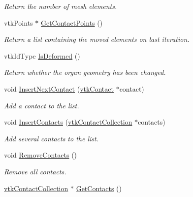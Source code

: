\begin{DoxyCompactItemize}
\begin{DoxyCompactList}\small\item\em Return the number of mesh elements. \item\end{DoxyCompactList}\item 
\hypertarget{classvtkOrgan_a4a34329d800d6b9f95c8b2dbcaddd520}{
vtkPoints $\ast$ \hyperlink{classvtkOrgan_a4a34329d800d6b9f95c8b2dbcaddd520}{GetContactPoints} ()}
\label{classvtkOrgan_a4a34329d800d6b9f95c8b2dbcaddd520}

\begin{DoxyCompactList}\small\item\em Return a list containing the moved elements on last iteration. \item\end{DoxyCompactList}\item 
\hypertarget{classvtkOrgan_aa0a8cb64b4c8caf84aa0b84dbd9d9882}{
vtkIdType \hyperlink{classvtkOrgan_aa0a8cb64b4c8caf84aa0b84dbd9d9882}{IsDeformed} ()}
\label{classvtkOrgan_aa0a8cb64b4c8caf84aa0b84dbd9d9882}

\begin{DoxyCompactList}\small\item\em Return whether the organ geometry has been changed. \item\end{DoxyCompactList}\item 
void \hyperlink{classvtkOrgan_aa10b506b56aab4c3b8050c9aaa179c5b}{InsertNextContact} (\hyperlink{classvtkContact}{vtkContact} $\ast$contact)
\begin{DoxyCompactList}\small\item\em Add a contact to the list. \item\end{DoxyCompactList}\item 
void \hyperlink{classvtkOrgan_aa61c5704ac5458ee9e5bfa6aed6014ce}{InsertContacts} (\hyperlink{classvtkContactCollection}{vtkContactCollection} $\ast$contacts)
\begin{DoxyCompactList}\small\item\em Add several contacts to the list. \item\end{DoxyCompactList}\item 
void \hyperlink{classvtkOrgan_abd019445a21886d765aec818b90add63}{RemoveContacts} ()
\begin{DoxyCompactList}\small\item\em Remove all contacts. \item\end{DoxyCompactList}\item 
\hypertarget{classvtkOrgan_a2e83706ca6ae182a7f521e9ab20b2214}{
\hyperlink{classvtkContactCollection}{vtkContactCollection} $\ast$ \hyperlink{classvtkOrgan_a2e83706ca6ae182a7f521e9ab20b2214}{GetContacts} ()}
\label{classvtkOrgan_a2e83706ca6ae182a7f521e9ab20b2214}


\end{DoxyCompactItemize}
